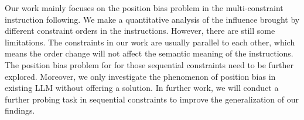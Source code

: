 Our work mainly focuses on the position bias problem in the multi-constraint instruction following. We make a quantitative analysis of the influence brought by different constraint orders in the instructions. However, there are still some limitations. The constraints in our work are usually parallel to each other, which means the order change will not affect the semantic meaning of the instructions. The position bias problem for for those sequential constraints need to be further explored. Moreover, we only investigate the phenomenon of position bias in existing LLM without offering a solution. In further work, we will conduct a further probing task in sequential constraints to improve the generalization of our findings.